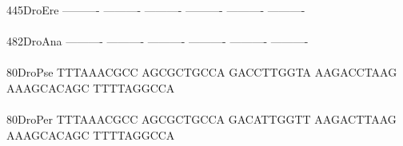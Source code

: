 \documentclass[11pt,twoside,reqno,a4paper]{article}
\begin{document}
{445\hspace*{2\charwidth}DroEre	----------	----------	----------	----------	----------	----------	\\
\hspace*{5\charwidth}\hspace*{7\charwidth}\hspace*{1\charwidth}\hspace*{1\charwidth}\hspace*{1\charwidth}\hspace*{1\charwidth}\hspace*{1\charwidth}\hspace*{1\charwidth}\\
482\hspace*{2\charwidth}DroAna	----------	----------	----------	----------	----------	----------	\\
\hspace*{5\charwidth}\hspace*{7\charwidth}\hspace*{1\charwidth}\hspace*{1\charwidth}\hspace*{1\charwidth}\hspace*{1\charwidth}\hspace*{1\charwidth}\hspace*{1\charwidth}\\
80\hspace*{3\charwidth}DroPse	TTTAAACGCC	AGCGCTGCCA	GACCTTGGTA	AAGACCTAAG	AAAGCACAGC	TTTTAGGCCA	\\
\hspace*{5\charwidth}\hspace*{7\charwidth}\hspace*{1\charwidth}\hspace*{1\charwidth}\hspace*{1\charwidth}\hspace*{1\charwidth}\hspace*{1\charwidth}\hspace*{1\charwidth}\\
80\hspace*{3\charwidth}DroPer	TTTAAACGCC	AGCGCTGCCA	GACATTGGTT	AAGACTTAAG	AAAGCACAGC	TTTTAGGCCA	\\
\hspace*{5\charwidth}\hspace*{7\charwidth}\hspace*{1\charwidth}\hspace*{1\charwidth}\hspace*{1\charwidth}\hspace*{1\charwidth}\hspace*{1\charwidth}\hspace*{1\charwidth}\\
}
\end{document}
